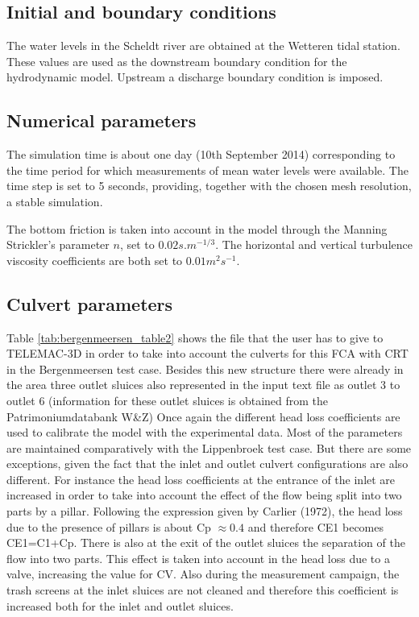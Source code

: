 \subsection{Initial and boundary conditions}
The water levels in the Scheldt river are obtained at the Wetteren tidal station. 
These values are used as the downstream boundary condition for the hydrodynamic model. 
Upstream a discharge boundary condition is imposed.
%
\subsection{Numerical parameters}
The simulation time is about one day (10th September 2014) corresponding to the time period 
for which measurements of mean water levels were available. 
The time step is set to 5 seconds, providing, together with the chosen mesh resolution, a stable simulation.

The bottom friction is taken into account in the model through the Manning Strickler’s parameter $n$, set to $0.02 s.m^{-1/3}$. 
The horizontal and vertical turbulence viscosity coefficients are both set to $0.01 m^2s^{-1}$.

\subsection{Culvert parameters}
Table \ref{tab:bergenmeersen_table2} shows the file that the user has to give to TELEMAC-3D in order to take 
into account the culverts for this FCA with CRT in the Bergenmeersen test case. 
Besides this new structure there were already in the area three outlet sluices 
also represented in the input text file as outlet 3 to outlet 6 
(information for these outlet sluices is obtained from the Patrimoniumdatabank W\&Z)
Once again the different head loss coefficients are used to calibrate the model 
with the experimental data. 
Most of the parameters are maintained comparatively with the Lippenbroek test case. 
But there are some exceptions, given the fact that the inlet and outlet culvert configurations are also different. 
For instance the head loss coefficients at the entrance of the inlet are increased in order to take 
into account the effect of the flow being split into two parts by a pillar. 
Following the expression given by Carlier (1972), the head loss due to the presence of pillars is about Cp $\approx 0.4$ 
and therefore CE1 becomes CE1=C1+Cp. 
There is also at the exit of the outlet sluices the separation of the flow into two parts. 
This effect is taken into account in the head loss due to a valve, increasing the value for CV. 
Also during the measurement campaign, the trash screens at the inlet sluices are 
not cleaned and therefore this coefficient is increased both for the inlet and outlet sluices.

